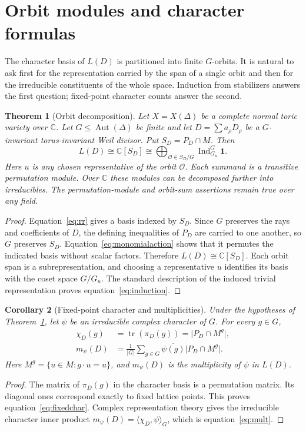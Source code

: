 \documentclass[12pt,letterpaper]{article}
\newtheorem{theorem}{Theorem}[section]
\newtheorem{corollary}[theorem]{Corollary}
\theoremstyle{definition}
\theoremstyle{remark}
\numberwithin{equation}{section}
\DeclareMathOperator{\Aut}{Aut}
\DeclareMathOperator{\Ind}{Ind}
\DeclareMathOperator{\tr}{tr}
\newcommand{\CC}{\mathbb C}
\newcommand{\bfone}{\mathbf 1}
\begin{document}
\section{Orbit modules and character formulas}\label{sec:representation}
The character basis of $L(D)$ is partitioned into finite $G$-orbits. It is natural to ask first for the representation carried by the span of a single orbit and then for the irreducible constituents of the whole space. Induction from stabilizers answers the first question; fixed-point character counts answer the second.

\begin{theorem}[Orbit decomposition]\label{thm:orbit}
Let $X=X(\Delta)$ be a complete normal toric variety over $\CC$. Let $G\leq\Aut(\Delta)$ be finite and let $D=\sum a_\rho D_\rho$ be a $G$-invariant torus-invariant Weil divisor. Put $S_D=P_D\cap M$. Then
\begin{equation}\label{eq:induction}
L(D)\cong\CC[S_D]\cong
\bigoplus_{\mathcal O\in S_D/G}\Ind_{G_u}^G\bfone.
\end{equation}
Here $u$ is any chosen representative of the orbit $\mathcal O$. Each summand is a transitive permutation module. Over $\CC$ these modules can be decomposed further into irreducibles. The permutation-module and orbit-sum assertions remain true over any field.
\end{theorem}
\begin{proof}
Equation~\eqref{eq:rr} gives a basis indexed by $S_D$. Since $G$ preserves the rays and coefficients of $D$, the defining inequalities of $P_D$ are carried to one another, so $G$ preserves $S_D$. Equation~\eqref{eq:monomialaction} shows that it permutes the indicated basis without scalar factors. Therefore $L(D)\cong\CC[S_D]$. Each orbit span is a subrepresentation, and choosing a representative $u$ identifies its basis with the coset space $G/G_u$. The standard description of the induced trivial representation proves equation~\eqref{eq:induction}.
\end{proof}

\begin{corollary}[Fixed-point character and multiplicities]\label{cor:character}
Under the hypotheses of Theorem~\ref{thm:orbit}, let $\psi$ be an irreducible complex character of $G$. For every $g\in G$,
\begin{align}
\chi_D(g)&=\tr(\pi_D(g))=\bigl|P_D\cap M^g\bigr|,\label{eq:fixedchar}\\
 m_\psi(D)&=\frac1{|G|}\sum_{g\in G}
 \overline{\psi(g)}\bigl|P_D\cap M^g\bigr|.\label{eq:mult}
\end{align}
Here $M^g=\{u\in M:g\cdot u=u\}$, and $m_\psi(D)$ is the multiplicity of $\psi$ in $L(D)$.
\end{corollary}
\begin{proof}
The matrix of $\pi_D(g)$ in the character basis is a permutation matrix. Its diagonal ones correspond exactly to fixed lattice points. This proves equation~\eqref{eq:fixedchar}. Complex representation theory gives the irreducible character inner product $m_\psi(D)=\langle\chi_D,\psi\rangle_G$, which is equation~\eqref{eq:mult}.
\end{proof}
\end{document}
